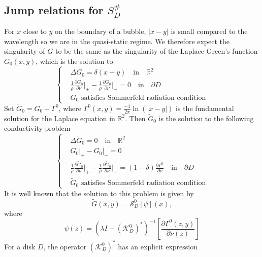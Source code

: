 \documentclass[a4paper]{article}
\theoremstyle{definition}
\newcommand{\R}{\mathbb{R}}
\newcommand{\ds}{\displaystyle}
\begin{document}
\subsection{Jump relations for $S_D^\#$}
For $x$ close to $y$ on the boundary of a bubble, $|x-y|$ is small compared to the wavelength so we are in the quasi-static regime. We therefore expect the singularity of $G$ to be the same as the singularity of the Laplace Green's function $G_0(x,y)$, which is the solution to 
\begin{equation*}
\left\{
\begin{array}{ll}
	&\ds \Delta G_0 = \delta(x-y) \quad \text{in}\quad \R^2 \\
	&\ds \frac{1}{\rho}\frac{\partial G_0}{\partial \nu}\bigg|_+ - \frac{1}{\rho}\frac{\partial G_0}{\partial \nu}\bigg|_- = 0 \quad \text{in} \quad \partial D \\
	&\ds G_0 \text{ satisfies Sommerfeld radiation condition} 
\end{array}
\right.	
\end{equation*}
Set $\tilde{G}_0 = G_0-\Gamma^0$, where $\Gamma^0(x,y)= \frac{-1}{2\pi}\ln(|x-y|)$ is the fundamental solution for the Laplace equation in $\R^2$. Then $\tilde{G}_0$ is the solution to the following conductivity problem
\begin{equation*}
\left\{
\begin{array}{ll}
&\ds \Delta \tilde{G}_0 = 0 \quad \text{in}\quad \R^2 \\
&\ds G_0\big|_+-G_0\big|_- = 0 \\
&\ds \frac{1}{\rho}\frac{\partial \tilde{G}_0}{\partial \nu}\bigg|_+ - \frac{1}{\rho}\frac{\partial \tilde{G}_0}{\partial \nu}\bigg|_- = (1-\delta)\frac{\partial \Gamma^0}{\partial \nu} \quad \text{in} \quad \partial D \\
&\ds \tilde{G}_0 \text{ satisfies Sommerfeld radiation condition} 
\end{array}
\right.	
\end{equation*}
It is well known that the solution to this problem is given by
\begin{equation*}
\tilde{G}(x,y) = \mathcal{S}_D^0 \left[\psi\right](x),
\end{equation*}
where
\begin{equation*}
\psi(z) = \left(\lambda I - \left( \mathcal{K}_D^0 \right)^*\right)^{-1} \left[ \frac{\partial\Gamma^0(z,y)}{\partial \nu(z)} \right] 
\end{equation*}
For a disk $D$, the operator $\left(\mathcal{K}_D^0\right)^*$ has an explicit expression
\end{document}
